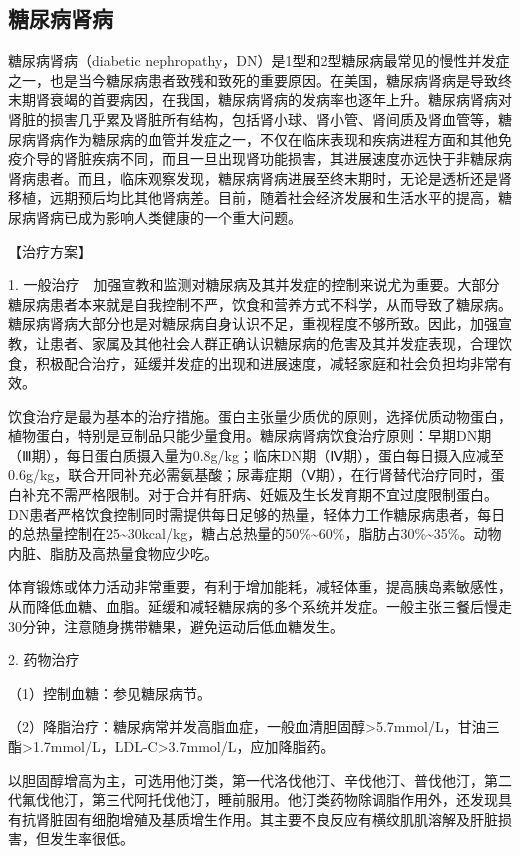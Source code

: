 \subsection{糖尿病肾病}

糖尿病肾病（diabetic
nephropathy，DN）是1型和2型糖尿病最常见的慢性并发症之一，也是当今糖尿病患者致残和致死的重要原因。在美国，糖尿病肾病是导致终末期肾衰竭的首要病因，在我国，糖尿病肾病的发病率也逐年上升。糖尿病肾病对肾脏的损害几乎累及肾脏所有结构，包括肾小球、肾小管、肾间质及肾血管等，糖尿病肾病作为糖尿病的血管并发症之一，不仅在临床表现和疾病进程方面和其他免疫介导的肾脏疾病不同，而且一旦出现肾功能损害，其进展速度亦远快于非糖尿病肾病患者。而且，临床观察发现，糖尿病肾病进展至终末期时，无论是透析还是肾移植，远期预后均比其他肾病差。目前，随着社会经济发展和生活水平的提高，糖尿病肾病已成为影响人类健康的一个重大问题。

【治疗方案】

1.
一般治疗　加强宣教和监测对糖尿病及其并发症的控制来说尤为重要。大部分糖尿病患者本来就是自我控制不严，饮食和营养方式不科学，从而导致了糖尿病。糖尿病肾病大部分也是对糖尿病自身认识不足，重视程度不够所致。因此，加强宣教，让患者、家属及其他社会人群正确认识糖尿病的危害及其并发症表现，合理饮食，积极配合治疗，延缓并发症的出现和进展速度，减轻家庭和社会负担均非常有效。

饮食治疗是最为基本的治疗措施。蛋白主张量少质优的原则，选择优质动物蛋白，植物蛋白，特别是豆制品只能少量食用。糖尿病肾病饮食治疗原则：早期DN期（Ⅲ期），每日蛋白质摄入量为0.8g/kg；临床DN期（Ⅳ期），蛋白每日摄入应减至0.6g/kg，联合开同补充必需氨基酸；尿毒症期（Ⅴ期），在行肾替代治疗同时，蛋白补充不需严格限制。对于合并有肝病、妊娠及生长发育期不宜过度限制蛋白。DN患者严格饮食控制同时需提供每日足够的热量，轻体力工作糖尿病患者，每日的总热量控制在25\textasciitilde{}30kcal/kg，糖占总热量的50\%\textasciitilde{}60\%，脂肪占30\%\textasciitilde{}35\%。动物内脏、脂肪及高热量食物应少吃。

体育锻炼或体力活动非常重要，有利于增加能耗，减轻体重，提高胰岛素敏感性，从而降低血糖、血脂。延缓和减轻糖尿病的多个系统并发症。一般主张三餐后慢走30分钟，注意随身携带糖果，避免运动后低血糖发生。

2. 药物治疗

（1）控制血糖：参见糖尿病节。

（2）降脂治疗：糖尿病常并发高脂血症，一般血清胆固醇\textgreater{}5.7mmol/L，甘油三酯\textgreater{}1.7mmol/L，LDL-C\textgreater{}3.7mmol/L，应加降脂药。

以胆固醇增高为主，可选用他汀类，第一代洛伐他汀、辛伐他汀、普伐他汀，第二代氟伐他汀，第三代阿托伐他汀，睡前服用。他汀类药物除调脂作用外，还发现具有抗肾脏固有细胞增殖及基质增生作用。其主要不良反应有横纹肌肌溶解及肝脏损害，但发生率很低。

